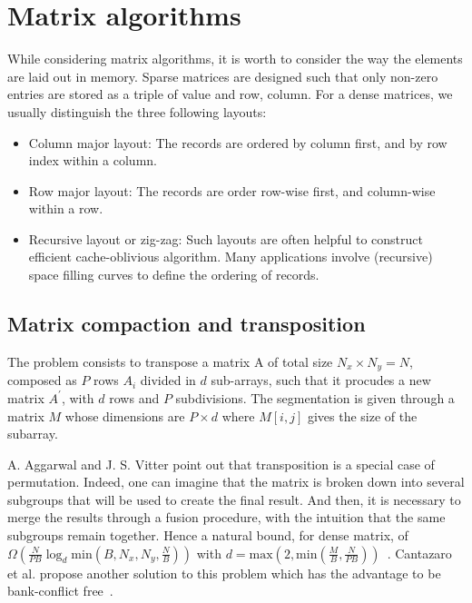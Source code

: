 

\section{Matrix algorithms}

While considering matrix algorithms, it is worth to consider the way the elements are laid out in memory. Sparse matrices are designed such that only non-zero entries are stored  as a triple of value and row, column. For a dense matrices, we usually distinguish the three following layouts:
\begin{itemize}
    \item Column major layout: The records are ordered by column first, and by row index within a column.
    \item Row major layout: The records are order row-wise first, and column-wise within a row.
    \item Recursive layout or zig-zag: Such layouts are often helpful to construct efficient cache-oblivious algorithm. Many applications involve (recursive) space filling curves to define the ordering of records.
\end{itemize}

\subsection{Matrix compaction and transposition}

The problem consists to transpose a matrix A of total size $N_{x} \times N_{y} = N$, composed as $P$ rows $A_{i}$ divided in $d$ sub-arrays, such that it procudes a new matrix $A^{'}$,
with $d$ rows and $P$ subdivisions. The segmentation is given through a matrix $M$ whose dimensions are 
$P \times d$ where $M[i, j]$ gives the size of the subarray.

A. Aggarwal and J. S. Vitter point out that transposition is a special case of permutation. Indeed, one can imagine that the matrix is broken down into several subgroups that will be used to create the final result. And then, it is necessary to merge the results through a fusion procedure, with the intuition that the same subgroups remain together. Hence a natural bound, for dense matrix, of $\Omega(\frac{N}{PB} \log_{d} \text{min}(B, N_{x}, N_{y}, \frac{N}{B}))$ with $d = \text{max}(2, \text{min}(\frac{M}{B}, \frac{N}{PB}))$~\cite{greiner2012sparse}. Cantazaro et al. propose another solution to this problem which has the advantage to be bank-conflict free~\cite{catanzaro2014decomposition}.

